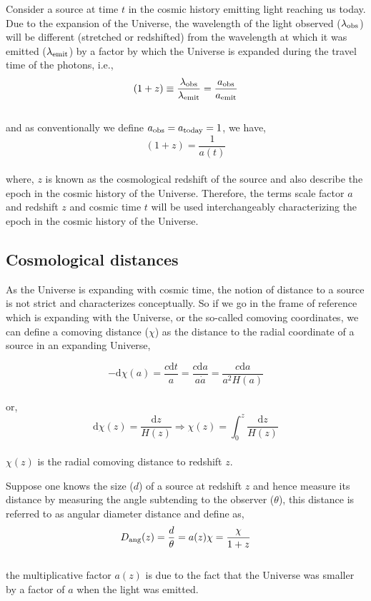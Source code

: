 Consider a source at time $t$ in the cosmic history emitting light reaching us today. 
Due to the expansion of the Universe, the wavelength of the light observed 
($\lambda_{\rm obs}$) will be different (stretched or redshifted) from the 
wavelength at which it was emitted ($\lambda_{\rm emit}$) by a factor by which
the Universe is expanded during the travel time of the photons, i.e.,
\begin{equation}
	(1+z) \equiv \dfrac{\lambda_{\rm obs}}{\lambda_{\rm emit}} = \dfrac{a_{\rm obs}}{a_{\rm emit}}
\end{equation}
\\
and as conventionally we define $a_{\rm obs} = a_{\rm today} = 1$, we have,
\begin{equation}
	(1+z) = \dfrac{1}{a(t)}
\end{equation}
\\
where, $z$ is known as the cosmological redshift of the source and also describe
the epoch in the cosmic history of the Universe. Therefore, the terms scale factor 
$a$ and redshift $z$ and cosmic time $t$ will be used interchangeably 
characterizing the epoch in the cosmic history of the Universe. 


\subsection{Cosmological distances}
As the Universe is expanding with cosmic time, the notion of distance to a source
is not strict and characterizes conceptually. So if we go in the frame of reference
which is expanding with the Universe, or the so-called comoving coordinates, we can
define a comoving distance ($\chi$) as the distance to the radial coordinate of a source in
an expanding Universe,

\begin{equation}
	-\mathrm{d}\chi(a) = \dfrac{c\mathrm{d}t}{a} = 
	\dfrac{c\mathrm{d}a}{a \dot{a}} = \dfrac{c\mathrm{d}a}{a^2 H(a)}
\end{equation}
\\
or,
\begin{equation}
	\mathrm{d}\chi(z) = \dfrac{\mathrm{d}z}{H(z)} 
	\Rightarrow \chi(z) = \int_0^z \dfrac{\mathrm{d}z}{H(z)}
\end{equation}
\\
$\chi(z)$ is the radial comoving distance to redshift $z$. 

Suppose one knows the size ($d$) of a source at redshift $z$ and hence measure its
distance by measuring the angle subtending to the observer ($\theta$), this distance is referred
to as angular diameter distance and define as,
\begin{equation}
	D_{\rm ang}(z) = \dfrac{d}{\theta} = a(z)\chi = \dfrac{\chi}{1+z}
\end{equation}
\\
the multiplicative factor $a(z)$ is due to the fact that the Universe was smaller by 
a factor of $a$ when the light was emitted. 

